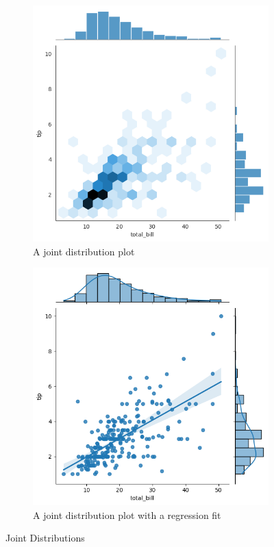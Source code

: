 \begin{figure}
    \centering
    \begin{subfigure}[b]{.45\textwidth}
        \includegraphics[width=\textwidth]{../Figures/A joint distribution plot.png}
        \caption{A joint distribution plot}
        \label{A joint distribution plot}
    \end{subfigure}
    \hfill
    \begin{subfigure}[b]{.45\textwidth}
        \includegraphics[width=\textwidth]{../Figures/A joint distribution plot with a regression fit.png}
        \caption{A joint distribution plot with a regression fit}
        \label{A joint distribution plot with a regression fit}
    \end{subfigure}
    \caption{Joint Distributions}
\end{figure}

